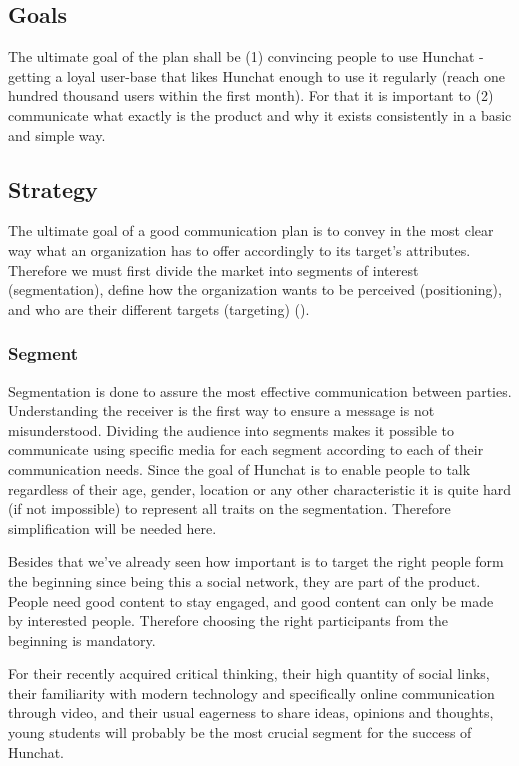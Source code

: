 \documentclass[12pt]{article}
\begin{document}
\subsection{Goals}
The ultimate goal of the plan shall be (1) convincing people to use Hunchat - getting a loyal user-base that likes Hunchat enough to use it regularly (reach one hundred thousand users within the first month).  For that it is important to (2) communicate what exactly is the product and why it exists consistently in a basic and simple way.

\subsection{Strategy}
The ultimate goal of a good communication plan is to convey in the most clear way what an organization has to offer accordingly to its target's attributes. Therefore we must first divide the market into segments of interest (segmentation), define how the organization wants to be perceived (positioning), and who are their different targets (targeting) (\cite{clow}). 

\subsubsection{Segment}
Segmentation is done to assure the most effective communication between parties. Understanding the receiver is the first way to ensure a message is not misunderstood. Dividing the audience into segments makes it possible to communicate using specific media for each segment according to each of their communication needs. Since the goal of Hunchat is to enable people to talk regardless of their age, gender, location or any other characteristic it is quite hard (if not impossible) to represent all traits on the segmentation.  Therefore simplification will be needed here. 

Besides that we've already seen how important is to target the right people form the beginning since being this a social network, they are part of the product. People need good content to stay engaged, and good content can only be made by interested people. Therefore choosing the right participants from the beginning is mandatory.

For their recently acquired critical thinking, their high quantity of social links, their familiarity with modern technology and specifically online communication through video, and their usual eagerness to share ideas, opinions and thoughts, young students will probably be the most crucial segment for the success of Hunchat. 
\end{document}
